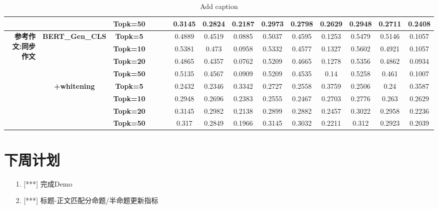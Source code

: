 \documentclass[11pt]{article}
\begin{document}
\begin{CJK}{UTF8}{gkai}
\begin{table}[htbp]
{\begin{tabular}{ccccccccccccccc}
      &       & \textbf{Topk=50} &       &       &       & 0.3145 & 0.2824 & 0.2187 & 0.2973 & 0.2798 & 0.2629 & 0.2948 & 0.2711 & 0.2408 \\
      \hline
      \multicolumn{1}{r}{\multirow{8}[0]{*}{\textbf{参考作文:同步作文}}} & \multicolumn{1}{c}{\multirow{4}[0]{*}{\textbf{BERT\_Gen\_CLS}}} & \textbf{Topk=5} &       &       &       & 0.4889 & 0.4519 & 0.0885 & 0.5037 & 0.4595 & 0.1253 & 0.5479 & 0.5146 & 0.1057 \\
      &       & \textbf{Topk=10} &       &       &       & 0.5381 & 0.473 & 0.0958 & 0.5332 & 0.4577 & 0.1327 & 0.5602 & 0.4921 & 0.1057 \\
      &       & \textbf{Topk=20} &       &       &       & 0.4865 & 0.4357 & 0.0762 & 0.5209 & 0.4665 & 0.1278 & 0.5356 & 0.4862 & 0.0934 \\
      &       & \textbf{Topk=50} &       &       &       & 0.5135 & 0.4567 & 0.0909 & 0.5209 & 0.4535 & 0.14  & 0.5258 & 0.461 & 0.1007 \\
      & \multicolumn{1}{c}{\multirow{4}[0]{*}{\textbf{+whitening}}} & \textbf{Topk=5} &       &       &       & 0.2432 & 0.2346 & 0.3342 & 0.2727 & 0.2558 & 0.3759 & 0.2506 & 0.24  & 0.3587 \\
      &       & \textbf{Topk=10} &       &       &       & 0.2948 & 0.2696 & 0.2383 & 0.2555 & 0.2467 & 0.2703 & 0.2776 & 0.263 & 0.2629 \\
      &       & \textbf{Topk=20} &       &       &       & 0.3145 & 0.2982 & 0.2138 & 0.2899 & 0.2882 & 0.2457 & 0.3022 & 0.2958 & 0.2236 \\
      &       & \textbf{Topk=50} &       &       &       & 0.317 & 0.2849 & 0.1966 & 0.3145 & 0.3032 & 0.2211 & 0.312 & 0.2923 & 0.2039 \\
      \hline
    \end{tabular}}%
  \caption{Add caption}
  \label{tab:addlabel}%
\end{table}%


\section{下周计划}
\begin{itemize}
\item [1.] [***] 完成Demo
\item [2.] [***] 标题-正文匹配分命题/半命题更新指标
\end{itemize}
%
%
%

\end{CJK}
\end{document}
